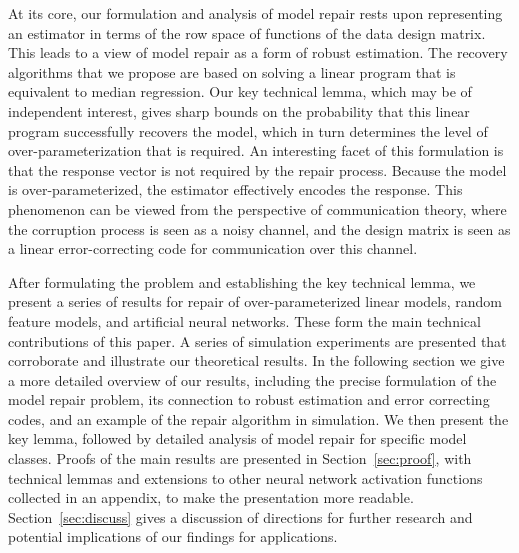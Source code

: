 At its core, our formulation and analysis of model repair rests upon representing an estimator in terms of the row space of functions of the data design matrix. This leads to a view of model repair as a form of robust estimation. The recovery algorithms that we propose are based on solving a linear program that is equivalent to median regression. Our key technical lemma, which may be of independent interest, gives sharp bounds on the probability that this linear program successfully recovers the model, which in turn determines the level of over-parameterization that is required. An interesting facet of this formulation is that the response vector is not required by the repair process. Because the model is over-parameterized, the estimator effectively encodes the response. This phenomenon can be viewed from the perspective of communication theory, where the corruption process is seen as a noisy channel, and the design matrix is seen as a linear error-correcting code for communication over this channel.

After formulating the problem  and establishing the key technical lemma, we present a series of results for
repair of over-parameterized linear models, random feature models, and artificial neural networks. These form the main technical contributions of this paper.
A series of simulation experiments are presented that corroborate and illustrate our theoretical results.
In the following section we give a more detailed overview of our results, including the precise formulation of the model repair problem, its connection to robust estimation and error correcting codes, and an example of the repair algorithm in simulation. We then present the key lemma, followed by detailed analysis of model repair for specific model classes.
Proofs of the main results are presented in Section~\ref{sec:proof}, with technical lemmas and extensions to other neural network activation functions collected in an appendix, to make the presentation more readable.
Section~\ref{sec:discuss} gives a discussion of directions for further research and potential implications of our findings for applications.
